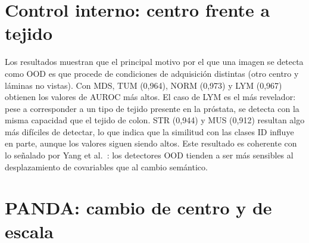 \section{Control interno: centro frente a tejido}\label{sec:ood-control-interno}



Los resultados muestran que el principal motivo por el que una imagen se detecta como OOD es que procede de condiciones de adquisición distintas (otro centro y láminas no vistas). 
Con MDS, TUM (0,964), NORM (0,973) y LYM (0,967) obtienen los valores de AUROC más altos. El caso de LYM es el más revelador: pese a corresponder a un tipo de tejido presente en 
la próstata, se detecta con la misma capacidad que el tejido de colon. STR (0,944) y MUS (0,912) resultan algo más difíciles de detectar, lo que indica que la similitud con las 
clases ID influye en parte, aunque los valores siguen siendo altos. Este resultado es coherente con lo señalado por Yang et al.~\cite{yang2024}: los detectores OOD tienden a ser 
más sensibles al desplazamiento de covariables que al cambio semántico.
%


\section{PANDA: cambio de centro y de escala}\label{sec:ood-panda}

